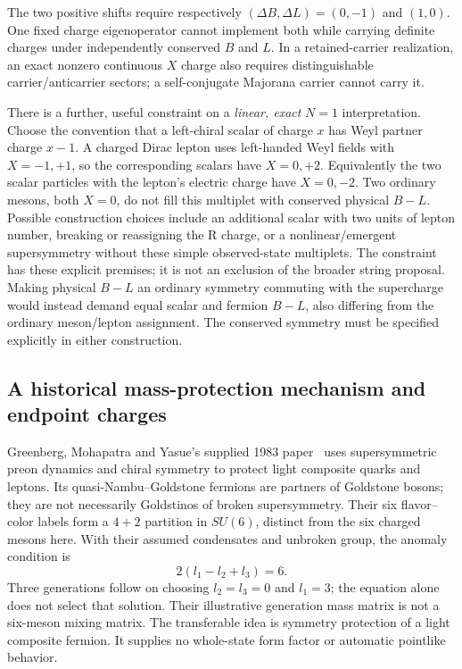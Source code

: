 The two positive shifts require respectively
$(\Delta B,\Delta L)=(0,-1)$ and $(1,0)$.
One fixed charge eigenoperator cannot implement both while carrying definite
charges under independently conserved $B$ and $L$. In a retained-carrier
realization, an exact nonzero continuous $X$ charge also requires distinguishable
carrier/anticarrier sectors; a self-conjugate Majorana carrier cannot carry it.

There is a further, useful constraint on a \emph{linear, exact} $N=1$
interpretation. Choose the convention that a left-chiral scalar of charge $x$
has Weyl partner charge $x-1$. A charged Dirac lepton uses left-handed Weyl
fields with $X=-1,+1$, so the corresponding scalars have $X=0,+2$.
Equivalently the two scalar particles with the lepton's electric charge have
$X=0,-2$. Two ordinary mesons, both $X=0$, do not fill this multiplet with
conserved physical $B-L$. Possible construction choices include an additional
scalar with two units of lepton number, breaking or reassigning the R charge,
or a nonlinear/emergent supersymmetry without these simple observed-state
multiplets. The constraint has these explicit premises; it is not an
exclusion of the broader string proposal.
Making physical $B-L$ an ordinary symmetry commuting with the supercharge
would instead demand equal scalar and fermion $B-L$, also differing from the
ordinary meson/lepton assignment. The conserved symmetry must be specified
explicitly in either construction.

\subsection{A historical mass-protection mechanism and endpoint charges}
Greenberg, Mohapatra and Yasue's supplied 1983 paper~\cite{GMY1983}
uses supersymmetric preon dynamics and chiral symmetry to protect light
composite quarks and leptons. Its quasi-Nambu--Goldstone fermions are partners
of Goldstone bosons; they are not necessarily Goldstinos of broken
supersymmetry. Their six flavor--color labels form a $4+2$ partition in
$SU(6)$, distinct from the six charged mesons here. With their assumed
condensates and unbroken group, the anomaly condition is
\begin{equation}
 2(l_1-l_2+l_3)=6.
\end{equation}
Three generations follow on choosing $l_2=l_3=0$ and $l_1=3$;
the equation alone does not select that solution. Their illustrative
generation mass matrix is not a six-meson mixing matrix. The transferable
idea is symmetry protection of a light composite fermion. It supplies no
whole-state form factor or automatic pointlike behavior.

